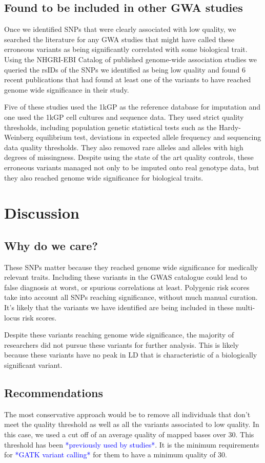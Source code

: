 \documentclass[9pt,lineno]{elife}
\newcommand{\todo}[1]{\textcolor{blue}{*#1*}}
\begin{document}
	\subsection{Found to be included in other GWA studies}
Once we identified SNPs that were clearly associated with low quality, we searched the literature for any GWA studies that might have called these erroneous variants as being significantly correlated with some biological trait. 
Using the NHGRI-EBI Catalog of published genome-wide association studies we queried the rsIDs of the SNPs we identified as being low quality and found 6 recent publications that had found at least one of the variants to have reached genome wide significance in their study. 

Five of these studies used the 1kGP as the reference database for imputation and one used the 1kGP cell cultures and sequence data. 
They used strict quality thresholds, including population genetic statistical tests such as the Hardy-Weinberg equilibrium test, deviations in expected allele frequency and sequencing data quality thresholds. 
They also removed rare alleles and alleles with high degrees of missingness. 
Despite using the state of the art quality controls, these erroneous variants managed not only to be imputed onto real genotype data, but they also reached genome wide significance for biological traits. 

			\section{Discussion}
\subsection{Why do we care?}
These SNPs matter because they reached genome wide significance for medically relevant traits. 
Including these variants in the GWAS catalogue could lead to false diagnosis at worst, or spurious correlations at least. 
Polygenic risk scores take into account all SNPs reaching significance, without much manual curation. 
It's likely that the variants we have identified are being included in these multi-locus risk scores.


Despite these variants reaching genome wide significance, the majority of researchers did not pursue these variants for further analysis.
This is likely because these variants have no peak in LD that is characteristic of a biologically significant variant.

\subsection{Recommendations}
The most conservative approach would be to remove all individuals that don't meet the quality threshold as well as all the variants associated to low quality.
In this case, we used a cut off of an average quality of mapped bases over 30. This threshold has been \todo{previously used by studies}. It is the minimum requirements for \todo{GATK variant calling} for them to have a minimum quality of 30.
\end{document}
